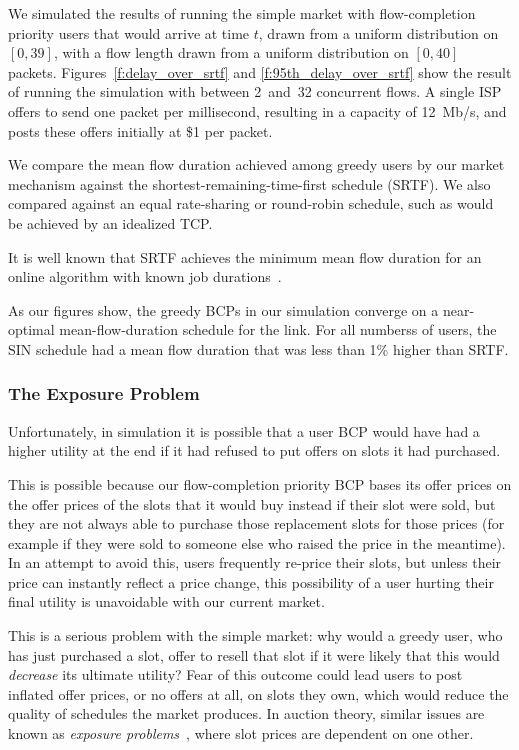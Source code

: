 We simulated the results of running the simple market with
flow-completion priority users that would arrive at time $t$, drawn
from a uniform distribution on $[0, 39]$, with a flow length drawn
from a uniform distribution on $[0, 40]$ packets.
Figures~\ref{f:delay_over_srtf} and \ref{f:95th_delay_over_srtf} show
the result of running the simulation with between 2~and~32 concurrent
flows. A single ISP offers to send one packet per millisecond,
resulting in a capacity of 12~Mb/s, and posts these offers initially at \$1 per
packet.

We compare the mean flow duration achieved among greedy users by our
market mechanism against the shortest-remaining-time-first schedule
(SRTF). We also compared against an equal rate-sharing or round-robin
schedule, such as would be achieved by an idealized TCP.

It is well known that SRTF achieves
the minimum mean flow duration for an online algorithm with
known job durations~\cite{karger10,bansal01}.

As our figures show, the greedy BCPs in our simulation converge on a
near-optimal mean-flow-duration schedule for the link. For all numberss
of users, the SIN schedule had a mean flow duration that was less
than 1\% higher than SRTF.

\subsubsection{The Exposure Problem}

Unfortunately, in simulation it is possible that a user BCP would have
had a higher utility at the end if it had refused to put offers on slots it had purchased.

This is possible because our flow-completion priority BCP bases its
offer prices on the offer prices of the slots that it would buy instead
if their slot were sold, but they are not always able to purchase
those replacement slots for those prices (for example if they were
sold to someone else who raised the price in the meantime). In an attempt to avoid
this, users frequently re-price their slots, but unless their price
can instantly reflect a price change, this possibility of a user
hurting their final utility is unavoidable with our current market.

This is a serious problem with the simple market: why would a greedy
user, who has just purchased a slot, offer to resell that slot if it
were likely that this would \emph{decrease} its ultimate utility?
Fear of this outcome could lead users to post inflated offer prices, or no offers at all, on
slots they own, which would reduce the quality of schedules the market
produces. In auction theory, similar issues are known as 
\emph{exposure problems}~\cite{milgrom00,
englmaier06}, where slot prices are dependent on one other.

